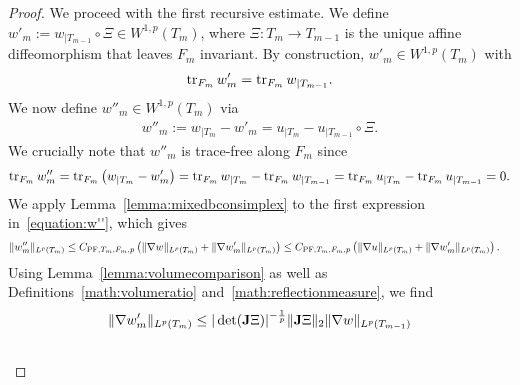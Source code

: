 \documentclass[10pt,a4paper]{article}
\begin{document}
\begin{proof}
    We proceed with the first recursive estimate. 
    We define $w'_{m} := w_{|T_{m-1}} \circ \Xi \in W^{1,p}(T_{m})$,
    where $\Xi : T_{m} \rightarrow T_{m-1}$ is the unique affine diffeomorphism that leaves $F_{m}$ invariant. 
    By construction, $w'_{m} \in W^{1,p}(T_{m})$ with 
    \begin{align*}
        \operatorname{tr}_{F_{m}} w'_{m} = \operatorname{tr}_{F_{m}} w_{|T_{m-1}}
        .
    \end{align*}
    We now define $w''_{m} \in W^{1,p}(T_{m})$ via 
    \begin{align}\label{equation:w''}
        w''_{m} 
        := 
        w_{|T_{m}} - w'_{m} = u_{|T_{m}} - u_{|T_{m-1}} \circ \Xi.
    \end{align}
    We crucially note that $w''_{m}$ is trace-free along $F_{m}$ since
    \begin{align*}
        \operatorname{tr}_{F_{m}} w''_{m} 
        = 
        \operatorname{tr}_{F_{m}} \left( 
            w_{|T_{m}} - w'_{m} 
        \right) 
        =
        \operatorname{tr}_{F_{m}} w_{|T_{m}}
        -
        \operatorname{tr}_{F_{m}} w_{|T_{m-1}}
        =
        \operatorname{tr}_{F_{m}} u_{|T_{m}}
        -
        \operatorname{tr}_{F_{m}} u_{|T_{m-1}}
        = 0.
    \end{align*}
    We apply Lemma~\ref{lemma:mixedbconsimplex} to the first expression in~\eqref{equation:w''}, which gives 
    \begin{align*}
        \| w''_{m} \|_{L^{p}(T_{m})} 
        &
        \leq 
        C_{{\rm PF},T_{m},F_{m},p} 
        \left( 
            \| \nabla w \|_{L^{p}(T_{m})} 
            + 
            \| \nabla w'_{m} \|_{L^{p}(T_{m})} 
        \right) 
        \leq 
        C_{{\rm PF},T_{m},F_{m},p} 
        \left( 
            \| \nabla u \|_{L^{p}(T_{m})} 
            + 
            \| \nabla w'_{m} \|_{L^{p}(T_{m})} 
        \right) 
        .
    \end{align*}
    Using Lemma~\ref{lemma:volumecomparison} as well as Definitions~\eqref{math:volumeratio} and~\eqref{math:reflectionmeasure}, we find 
    \begin{align*}
        \| \nabla w'_{m} \|_{L^{p}(T_{m})}
        &
        \leq 
        |\det(\Jacobian \Xi  )|^{-\frac 1 p} 
        \matnorm{ \Jacobian \Xi }
        \| \nabla w \|_{L^{p}(T_{m-1})}
        \\&

\end{align*}
\end{proof}
\end{document}
